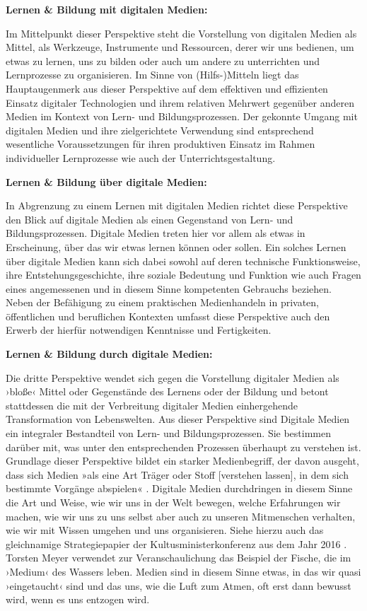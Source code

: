 \documentclass[
  a4paper,
]{book}
\begin{document}
\textbf{Lernen \& Bildung mit digitalen Medien:}

Im Mittelpunkt dieser Perspektive steht die Vorstellung von digitalen Medien als Mittel, als Werkzeuge, Instrumente und Ressourcen, derer wir uns bedienen, um etwas zu lernen, uns zu bilden oder auch um andere zu unterrichten und Lernprozesse zu organisieren. Im Sinne von (Hilfs-)Mitteln liegt das Hauptaugenmerk aus dieser Perspektive auf dem effektiven und effizienten Einsatz digitaler Technologien und ihrem relativen Mehrwert gegenüber anderen Medien im Kontext von Lern- und Bildungsprozessen. Der gekonnte Umgang mit digitalen Medien und ihre zielgerichtete Verwendung sind entsprechend wesentliche Voraussetzungen für ihren produktiven Einsatz im Rahmen individueller Lernprozesse wie auch der Unterrichtsgestaltung.

\textbf{Lernen \& Bildung über digitale Medien:}

In Abgrenzung zu einem Lernen mit digitalen Medien richtet diese Perspektive den Blick auf digitale Medien als einen Gegenstand von Lern- und Bildungsprozessen. Digitale Medien treten hier vor allem als etwas in Erscheinung, über das wir etwas lernen können oder sollen. Ein solches Lernen über digitale Medien kann sich dabei sowohl auf deren technische Funktionsweise, ihre Entstehungsgeschichte, ihre soziale Bedeutung und Funktion wie auch Fragen eines angemessenen und in diesem Sinne kompetenten Gebrauchs beziehen. Neben der Befähigung zu einem praktischen Medienhandeln in privaten, öffentlichen und beruflichen Kontexten umfasst diese Perspektive auch den Erwerb der hierfür notwendigen Kenntnisse und Fertigkeiten.

\textbf{Lernen \& Bildung durch digitale Medien:}

Die dritte Perspektive wendet sich gegen die Vorstellung digitaler Medien als ›bloße‹ Mittel oder Gegenstände des Lernens oder der Bildung und betont stattdessen die mit der Verbreitung digitaler Medien einhergehende Transformation von Lebenswelten. Aus dieser Perspektive sind Digitale Medien ein integraler Bestandteil von Lern- und Bildungsprozessen. Sie bestimmen darüber mit, was unter den entsprechenden Prozessen überhaupt zu verstehen ist. Grundlage dieser Perspektive bildet ein starker Medienbegriff, der davon ausgeht, dass sich Medien »als eine Art Träger oder Stoff {[}verstehen lassen{]}, in dem sich bestimmte Vorgänge abspielen« \citep[S. 91]{meyerBildungNeuenMediums2014}. Digitale Medien durchdringen in diesem Sinne die Art und Weise, wie wir uns in der Welt bewegen, welche Erfahrungen wir machen, wie wir uns zu uns selbst aber auch zu unseren Mitmenschen verhalten, wie wir mit Wissen umgehen und uns organisieren. Siehe hierzu auch das gleichnamige Strategiepapier der Kultusministerkonferenz aus dem Jahr 2016 \citep{kultusministerkonferenzBildungDigitalenWelt2016}. Torsten Meyer \citep[S. 91]{meyerBildungNeuenMediums2014} verwendet zur Veranschaulichung das Beispiel der Fische, die im ›Medium‹ des Wassers leben. Medien sind in diesem Sinne etwas, in das wir quasi ›eingetaucht‹ sind und das uns, wie die Luft zum Atmen, oft erst dann bewusst wird, wenn es uns entzogen wird.
\end{document}
